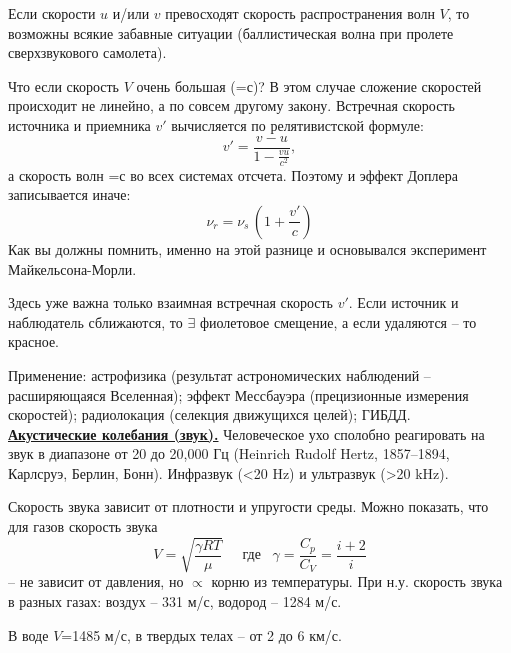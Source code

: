 \documentclass[12pt,epsfig,color,russian]{article}
\begin{document}
Если скорости $u$ и/или $v$ превосходят скорость распространения волн $V$, то возможны всякие забавные ситуации (баллистическая волна при пролете сверхзвукового самолета).

Что если скорость $V$ очень большая (=с)?  В этом случае сложение скоростей происходит не линейно, а по совсем другому закону. Встречная скорость источника и приемника $v'$ вычисляется по релятивистской формуле:
\begin{displaymath}
v'=\frac{v-u}{1-\frac{vu}{c^2}},
\end{displaymath}
а скорость волн =$с$ во всех системах отсчета. Поэтому и эффект Доплера записывается иначе:
\begin{displaymath}
 \nu_r=\nu_s\,\left(1+\frac {v'}c\right)
\end{displaymath}
Как вы должны помнить, именно на этой разнице и основывался эксперимент Майкельсона-Морли.

Здесь уже важна только взаимная встречная скорость $v'$. Если источник и наблюдатель сближаются, то  $\exists$ фиолетовое смещение, а если удаляются -- то красное.

Применение: астрофизика (результат астрономических наблюдений -- расширяющаяся Вселенная); эффект Мессбауэра (прецизионные из\-ме\-ре\-ния скоростей); радиолокация (селекция движущихся целей); ГИБДД.\\

\underline{\bf Акустические колебания (звук).}
Человеческое ухо сполобно ре\-а\-ги\-ро\-вать на звук в диапазоне от 20 до 20,000 Гц (Heinrich Rudolf Hertz, 1857--1894, Карлсруэ, Берлин, Бонн). Инфразвук (<20 Hz) и ультразвук (>20 kHz).

Скорость звука зависит от плотности и упругости среды. Можно по\-ка\-зать, что для газов скорость звука
\begin{displaymath}
V=\sqrt{\frac{\gamma RT}{\mu}}\;\;\;\;\;\texttt{где}\;\;\;\gamma=\frac{C_p}{C_V}=\frac{i+2}i
\end{displaymath}
-- не зависит от давления, но $\propto$ корню из температуры. При н.у. скорость звука в разных газах: воздух -- 331 м/с, водород -- 1284 м/с.

В воде $V$=1485 м/с, в твердых телах -- от 2 до 6 км/с.
\end{document}
